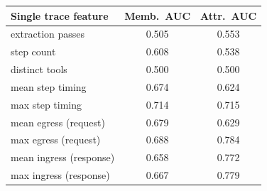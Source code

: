 {\setlength{\tabcolsep}{5pt}\renewcommand{\arraystretch}{1.15}
\begin{tabular}{@{}lcc@{}}
\toprule
Single trace feature & Memb.\ AUC & Attr.\ AUC \\
\midrule
extraction passes & 0.505 & 0.553 \\
step count        & 0.608 & 0.538 \\
distinct tools    & 0.500 & 0.500 \\
mean step timing  & 0.674 & 0.624 \\
max step timing   & 0.714 & 0.715 \\
mean egress (request) & 0.679 & 0.629 \\
max egress (request) & 0.688 & 0.784 \\
mean ingress (response) & 0.658 & 0.772 \\
max ingress (response) & 0.667 & 0.779 \\
\bottomrule
\end{tabular}}
